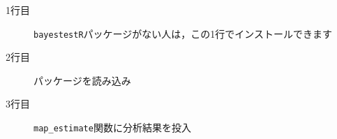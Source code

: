 \begin{description}
	\item[1行目] \texttt{bayestestR}パッケージがない人は，この1行でインストールできます
	\item[2行目] パッケージを読み込み
	\item[3行目] \verb|map_estimate|関数に分析結果を投入
\end{description}
